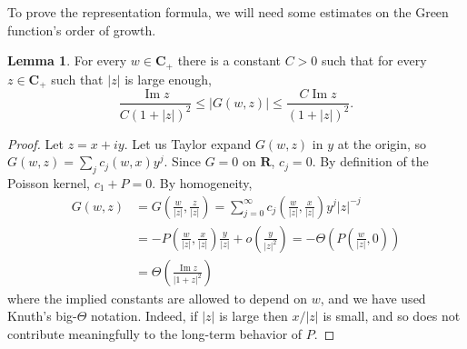 \documentclass[12pt]{report}
\newcommand{\RR}{\mathbf{R}}
\newcommand{\CC}{\mathbf{C}}
\renewcommand{\Im}{\operatorname{Im}}
\theoremstyle{definition}
\newtheorem{lemma}[theorem]{Lemma}
\begin{document}
To prove the representation formula, we will need some estimates on the Green function's order of growth.
\begin{lemma}
\label{estimate on Green function}
    For every $w \in \CC_+$ there is a constant $C > 0$ such that for every $z \in \CC_+$ such that $|z|$ is large enough,
$$\frac{\Im z}{C(1 + |z|)^2} \leq |G(w, z)| \leq \frac{C \Im z}{(1 + |z|)^2}.$$
\end{lemma}
\begin{proof}
  Let $z = x + iy$. Let us Taylor expand $G(w, z)$ in $y$ at the origin, so $G(w, z) = \sum_j c_j(w, x) y^j$. Since $G = 0$ on $\RR$, $c_j = 0$. By definition of the Poisson kernel, $c_1 + P = 0$. By homogeneity,
\begin{align*}
  G(w, z) &= G\left(\frac{w}{|z|}, \frac{z}{|z|}\right) = \sum_{j=0}^\infty c_j\left(\frac{w}{|z|}, \frac{x}{|z|}\right) y^j |z|^{-j}
  \\&= -P\left(\frac{w}{|z|}, \frac{x}{|z|}\right) \frac{y}{|z|} + o\left(\frac{y}{|z|^2} \right) = -\Theta\left(P\left(\frac{w}{|z|}, 0\right)\right)
  \\&= \Theta \left(\frac{\Im z}{|1 + z|^2}\right)
\end{align*}
  where the implied constants are allowed to depend on $w$, and we have used Knuth's big-$\Theta$ notation. Indeed, if $|z|$ is large then $x/|z|$ is small, and so does not contribute meaningfully to the long-term behavior of $P$.
\end{proof}
\end{document}
